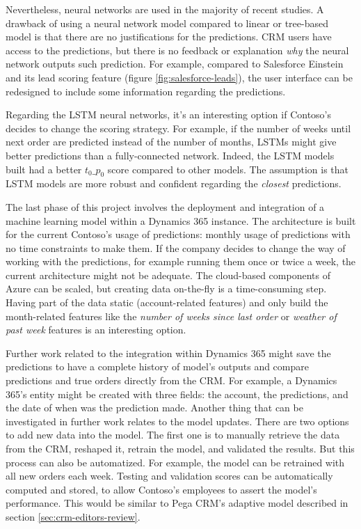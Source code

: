 Nevertheless, neural networks are used in the majority of recent studies. A drawback of using a neural network model compared to linear or tree-based model is that there are no justifications for the predictions. CRM users have access to the predictions, but there is no feedback or explanation \textit{why} the neural network outputs such prediction. For example, compared to Salesforce Einstein and its lead scoring feature (figure \ref{fig:salesforce-leads}), the user interface can be redesigned to include some information regarding the predictions.

Regarding the LSTM neural networks, it's an interesting option if Contoso's decides to change the scoring strategy. For example, if the number of weeks until next order are predicted instead of the number of months, LSTMs might give better predictions than a fully-connected network. Indeed, the LSTM models built had a better $t_0\_p_0$ score compared to other models. The assumption is that LSTM models are more robust and confident regarding the \textit{closest} predictions.

The last phase of this project involves the deployment and integration of a machine learning model within a Dynamics 365 instance. The architecture is built for the current Contoso's usage of predictions: monthly usage of predictions with no time constraints to make them. If the company decides to change the way of working with the predictions, for example running them once or twice a week, the current architecture might not be adequate. The cloud-based components of Azure can be scaled, but creating data on-the-fly is a time-consuming step. Having part of the data static (account-related features) and only build the month-related features like the \textit{number of weeks since last order} or \textit{weather of past week} features is an interesting option.

Further work related to the integration within Dynamics 365 might save the predictions to have a complete history of model's outputs and compare predictions and true orders directly from the CRM. For example, a Dynamics 365's entity might be created with three fields: the account, the predictions, and the date of when was the prediction made. 
Another thing that can be investigated in further work relates to the model updates. There are two options to add new data into the model. The first one is to manually retrieve the data from the CRM, reshaped it, retrain the model, and validated the results. But this process can also be automatized. For example, the model can be retrained with all new orders each week. Testing and validation scores can be automatically computed and stored, to allow Contoso's employees to assert the model's performance. This would be similar to Pega CRM's adaptive model described in section \ref{sec:crm-editors-review}.